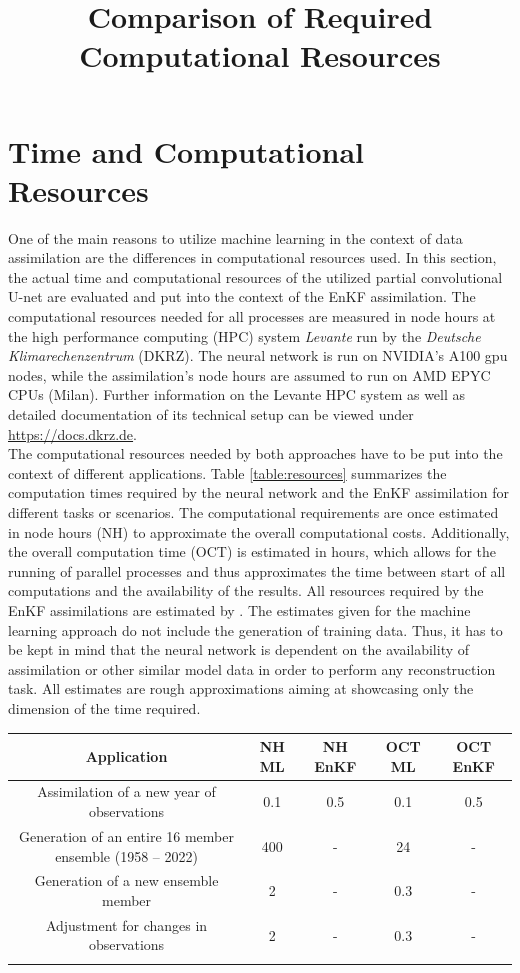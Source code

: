 \documentclass[Masterarbeit.tex]{subfile}
\begin{document}
	\section{Time and Computational Resources}
	
	One of the main reasons to utilize machine learning in the context of data assimilation are the differences in computational resources used. In this section, the actual time and computational resources of the utilized partial convolutional U-net are evaluated and put into the context of the EnKF assimilation. The computational resources needed for all processes are measured in node hours at the high performance computing (HPC) system \textit{Levante} run by the \textit{Deutsche Klimarechenzentrum} (DKRZ). The neural network is run on NVIDIA's A100 gpu nodes, while the assimilation's node hours are assumed to run on AMD EPYC CPUs (Milan). Further information on the Levante HPC system as well as detailed documentation of its technical setup can be viewed under \url{https://docs.dkrz.de}.\\
	The computational resources needed by both approaches have to be put into the context of different applications. Table \ref{table:resources} summarizes the computation times required by the neural network and the EnKF assimilation for different tasks or scenarios. The computational requirements are once estimated in node hours (NH) to approximate the overall computational costs. Additionally, the overall computation time (OCT) is estimated in hours, which allows for the running of parallel processes and thus approximates the time between start of all computations and the availability of the results.  All resources required by the EnKF assimilations are estimated by \cite{brune_personal_2022}. The estimates given for the machine learning approach do not include the generation of training data. Thus, it has to be kept in mind that the neural network is dependent on the availability of assimilation or other similar model data in order to perform any reconstruction task. All estimates are rough approximations aiming at showcasing only the dimension of the time required. \\
	
	\begin{center}
		\begin{tabular}{ c|c|c|c|c }
			\title{Comparison of Required Computational Resources}
			Application & NH ML & NH EnKF & OCT ML & OCT EnKF \\ 
			\hline
			Assimilation of a new year of observations & 0.1 & 0.5 & 0.1 & 0.5\\ 
			\hline
			Generation of an entire 16 member ensemble (1958 -- 2022) & 400 & - & 24 & -  \\ 
			\hline
			Generation of a new ensemble member & 2 & - & 0.3 & - \\
			\hline
			Adjustment for changes in observations & 2 & - & 0.3 & - \\
			\label{table:resources}
		\end{tabular}
	\end{center}
	
\end{document}
